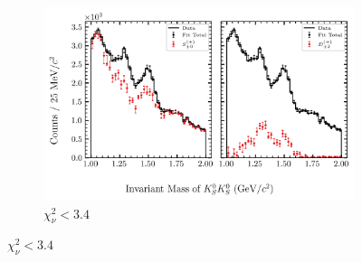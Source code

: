 \begin{figure}[htbp]
    \begin{subfigure}{0.8\textwidth}
        \includegraphics[width=\linewidth]{figures/binned_fit_chisqdof_3.4_splot_D_1s_2b_phase_factor_waves491_uncertainty_bootstrap-CI-BC.png}
        \caption{$\chi^2_\nu < 3.4$}
    \end{subfigure}

    \vspace{1em}


\end{figure}
